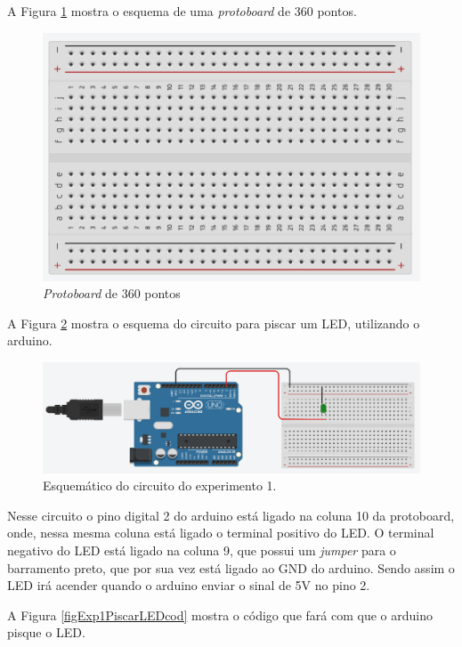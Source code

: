 \documentclass[12pt]{article}
\begin{document}
	A Figura \ref{figProtoboard} mostra o esquema de uma \textit{protoboard} de 360 pontos.

	\begin{figure}[h!]
		\centering
		\includegraphics[scale=0.5]{Imagens/figProtoboard.png}
		\caption{\textit{Protoboard} de 360 pontos}
		\label{figProtoboard}
	\end{figure}

	A Figura \ref{figExp1PiscarLEDesq} mostra o esquema do circuito para piscar um LED, utilizando o arduino.

	\begin{figure}[h!]
		\centering
		\includegraphics[scale=0.3]{Imagens/Experimentos/1-PiscarLED/1-PiscarLED.png}
		\caption{Esquemático do circuito do experimento 1.}
		\label{figExp1PiscarLEDesq}
	\end{figure}

	Nesse circuito o pino digital 2 do arduino está ligado na coluna 10 da protoboard, onde, nessa mesma coluna está ligado o terminal positivo do LED. O terminal negativo do LED está ligado na coluna 9, que possui um \textit{jumper} para o barramento preto, que por sua vez está ligado ao GND do arduino. Sendo assim o LED irá acender quando o arduino enviar o sinal de 5V no pino 2.

	A Figura \ref{figExp1PiscarLEDcod} mostra o código que fará com que o arduino pisque o LED.
\end{document}
